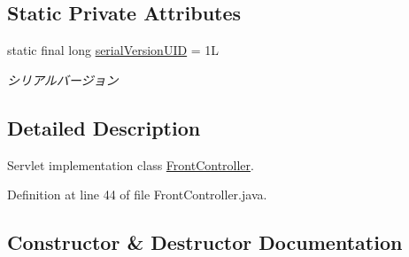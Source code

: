 \subsection*{Static Private Attributes}
\begin{DoxyCompactItemize}
\item 
\mbox{\label{classjp_1_1gr_1_1java__conf_1_1yuta__yoshinaga_1_1reversi_1_1controller_1_1_front_controller_a42e40239dd4f246bd1524cdb08ca41af}} 
static final long \hyperlink{classjp_1_1gr_1_1java__conf_1_1yuta__yoshinaga_1_1reversi_1_1controller_1_1_front_controller_a42e40239dd4f246bd1524cdb08ca41af}{serial\+Version\+U\+ID} = 1L
\begin{DoxyCompactList}\small\item\em シリアルバージョン \end{DoxyCompactList}\end{DoxyCompactItemize}


\subsection{Detailed Description}
Servlet implementation class \hyperlink{classjp_1_1gr_1_1java__conf_1_1yuta__yoshinaga_1_1reversi_1_1controller_1_1_front_controller}{Front\+Controller}. 

Definition at line 44 of file Front\+Controller.\+java.



\subsection{Constructor \& Destructor Documentation}
\mbox{\label{classjp_1_1gr_1_1java__conf_1_1yuta__yoshinaga_1_1reversi_1_1controller_1_1_front_controller_a918d736b7b4d8672076c15f8ca05075c}} 
